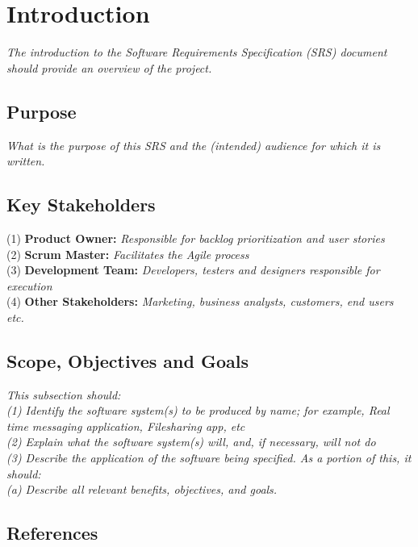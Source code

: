 \section{Introduction}

\textit{The introduction to the Software Requirements Specification (SRS) document should provide an overview of the project.}

\subsection{Purpose}

\textit{What is the purpose of this SRS and the (intended) audience for which it is written.}

\subsection{Key Stakeholders}

(1) \textbf{Product Owner:} \textit{Responsible for backlog prioritization and user stories} \\
(2) \textbf{Scrum Master:} \textit{Facilitates the Agile process} \\
(3) \textbf{Development Team:} \textit{Developers, testers and designers responsible for execution} \\
(4) \textbf{Other Stakeholders:} \textit{Marketing, business analysts, customers, end users etc.} \\

\subsection{Scope, Objectives and Goals}

\textit{This subsection should:} \\
\textit{(1) Identify the software system(s) to be produced by name; for example, Real time messaging application, Filesharing app, etc} \\
\textit{(2) Explain what the software system(s) will, and, if necessary, will not do} \\
\textit{(3) Describe the application of the software being specified. As a portion of this, it should:} \\
\textit{  (a) Describe all relevant benefits, objectives, and goals.} \\

\subsection{References}

